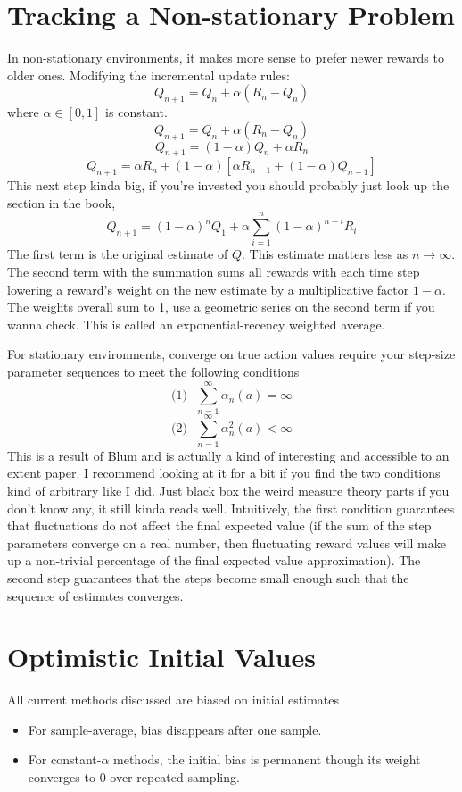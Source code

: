 \documentclass[a4paper]{report}
\begin{document}
\section{Tracking a Non-stationary Problem}
In non-stationary environments, it makes more sense to prefer newer rewards to older ones. Modifying the incremental update rules: $$Q_{n+1} = Q_n + \alpha(R_n - Q_n)$$ where $\alpha \in [0,1]$ is constant. $$Q_{n+1} = Q_n + \alpha(R_n - Q_n) $$ $$Q_{n+1} = (1-\alpha)Q_n + \alpha R_n$$ $$Q_{n+1} = \alpha R_n + (1-\alpha)[\alpha R_{n-1} + (1-\alpha)Q_{n-1}]$$ This next step kinda big, if you're invested you should probably just look up the section in the book, $$Q_{n+1} = (1-\alpha)^n Q_1 + \alpha \sum_{i=1}^n (1-\alpha)^{n-i}R_i$$ The first term is the original estimate of $Q$. This estimate matters less as $n \rightarrow \infty$. The second term with the summation sums all rewards with each time step lowering a reward's weight on the new estimate by a multiplicative factor $1-\alpha$. The weights overall sum to 1, use a geometric series on the second term if you wanna check. This is called an exponential-recency weighted average.

For stationary environments, converge on true action values require your step-size parameter sequences to meet the following conditions $$\text{(1)}~~~\sum_{n=1}^{\infty} \alpha_n(a) = \infty$$ $$\text{(2)}~~~\sum_{n=1}^{\infty} \alpha^2_n(a) < \infty$$ This is a result of Blum and is actually a kind of interesting and accessible to an extent paper. I recommend looking at it for a bit if you find the two conditions kind of arbitrary like I did. Just black box the weird measure theory parts if you don't know any, it still kinda reads well. Intuitively, the first condition guarantees that fluctuations do not affect the final expected value (if the sum of the step parameters converge on a real number, then fluctuating reward values will make up a non-trivial percentage of the final expected value approximation). The second step guarantees that the steps become small enough such that the sequence of estimates converges.

\section{Optimistic Initial Values}
All current methods discussed are biased on initial estimates

\begin{itemize}
  \item For sample-average, bias disappears after one sample.
  \item For constant-$\alpha$ methods, the initial bias is permanent though its weight converges to $0$ over repeated sampling.
\end{itemize}
\end{document}
